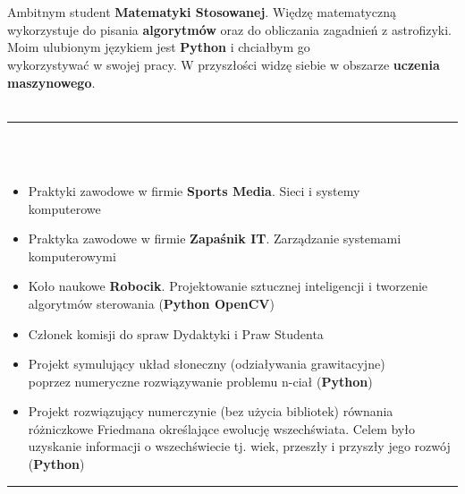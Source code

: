 \documentclass[10pt]{article}
\begin{document}
    \begin{minipage}[t]{0.60\textwidth}
        \fontsize{10pt}{10pt} \\ \\
        Ambitnym student \textbf{Matematyki Stosowanej}. Więdzę matematyczną wykorzystuje do pisania \textbf{algorytmów} oraz do obliczania zagadnień z astrofizyki.
        Moim ulubionym językiem jest \textbf{Python} i chciałbym go \\wykorzystywać w swojej pracy. W przyszłości widzę siebie w obszarze \textbf{uczenia maszynowego}. \\ \\
        \rule{11cm}{1pt} \\ \\
        \fontsize{10pt}{10pt}
        \begin{itemize}[leftmargin=*]
            \setlength{\parskip}{0pt}
            \item Praktyki zawodowe w firmie \textbf{Sports Media}. Sieci i systemy \\ komputerowe
            \item Praktyka zawodowe w firmie \textbf{Zapaśnik IT}. Zarządzanie systemami  \\komputerowymi
            \item Koło naukowe \textbf{Robocik}. Projektowanie sztucznej inteligencji i tworzenie algorytmów sterowania (\textbf{Python OpenCV})
            \item Członek komisji do spraw Dydaktyki i Praw Studenta
            \item Projekt symulujący układ słoneczny (odziaływania grawitacyjne) \\ poprzez numeryczne rozwiązywanie problemu n-ciał  (\textbf{Python})
            \item Projekt rozwiązujący numerczynie (bez użycia bibliotek) równania różniczkowe Friedmana określające ewolucję wszechświata.
            Celem było uzyskanie informacji o wszechświecie tj. wiek, przeszły i przyszły jego rozwój (\textbf{Python})
        \end{itemize}
        \rule{11cm}{1pt} \\ \\
        \fontsize{10pt}{10pt}
        \begin{itemize}[leftmargin=*]
            \setlength{\parskip}{0pt}

\end{itemize}
\end{minipage}
\end{document}

